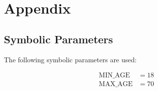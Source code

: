 \documentclass[12pt, titlepage]{article}
\begin{document}











\newpage





\newpage

\section{Appendix}

\subsection{Symbolic Parameters}
The following symbolic parameters are used:

\begin{align*}
 \text{MIN\_AGE} &= 18\\
 \text{MAX\_AGE} &= 70\\
\end{align*}
\end{document}

